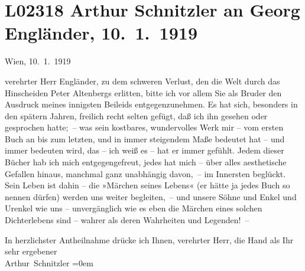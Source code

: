 

\section[Arthur Schnitzler an Georg Engländer, 10. 1. 1919]{L02318 Arthur Schnitzler an Georg Engländer, 10. 1. 1919}
\nopagebreak{}
\rehead{ }\normalsize\beginnumbering{}
\toendnotes[C]{\smallbreak\pagebreak[2]}
\toendnotes[C]{\smallbreak}
\pstart
           \raggedleft{}{\pb}Wien, 10. 1. 1919\pend
           
\pstart{}verehrter Herr Engländer,\pend\vspace{0.5em}
\pstart
           zu dem schweren Verlust, den die Welt durch das Hinscheiden Peter Altenbergs erlitten, bitte ich vor allem Sie als Bruder
               den Ausdruck meines innigsten Beileids entgegenzunehmen. Es hat sich, besonders in
               den spätern Jahren, freilich recht selten gefügt, daß ich ihn gesehen oder gesprochen
               hatte; – was sein kostbares, wundervolles Werk mir – vom ersten Buch an bis zum letzten, und in immer steigendem Maße bedeutet hat – und
               immer bedeuten wird, das – ich weiß es – hat er immer gefühlt. Jedem dieser Bücher
               hab ich mich entgegengefreut, jedes hat mich – über alles aesthetische Gefallen
               hinaus, manchmal ganz unabhängig davon, – im Innersten beglückt. Sein Leben ist dahin
               – die »Märchen seines Lebens«
               (er hätte ja jedes Buch so nennen dürfen) werden uns weiter begleiten, – und unsere
               Söhne und Enkel und Urenkel wie uns – unvergänglich wie es eben die Märchen eines
               solchen Dichterlebens sind – wahrer als deren Wahrheiten und Legenden! –\pend
           
\pstart
           In herzlichster Antheilnahme drücke ich Ihnen, verehrter Herr, die Hand als Ihr
               sehr ergebener{\\[\baselineskip]}\spacefill\mbox{Arthur Schnitzler}\pend
           \leftskip=0em{}\endnumbering{}  
      
